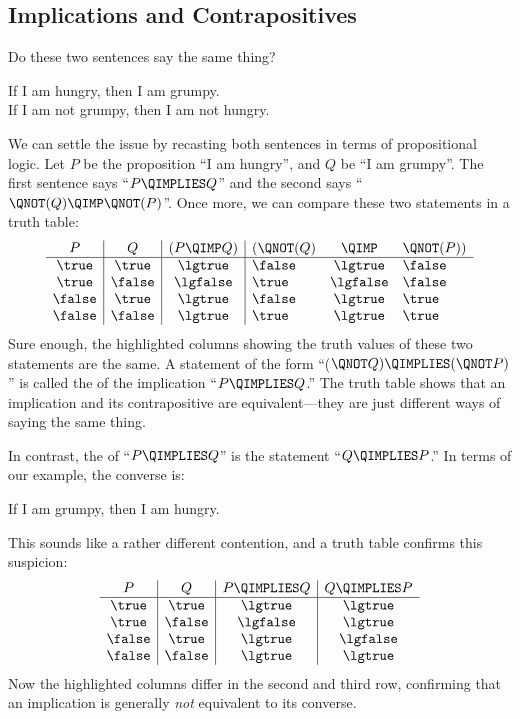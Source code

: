 \subsection{Implications and Contrapositives}\label{implication_sec}
Do these two sentences say the same thing?
%
\begin{center}
If I am hungry, then I am grumpy. \\
If I am not grumpy, then I am not hungry.
\end{center}
%
We can settle the issue by recasting both sentences in terms of
propositional logic.  Let $P$ be the proposition ``I am hungry'', and $Q$
be ``I am grumpy''.  The first sentence says ``$P \QIMPLIES Q$'' and the
second says ``$\QNOT(Q) \QIMP \QNOT(P)$''.  Once more, we can compare
these two statements in a truth table:
%
\[
\begin{array}{c|c|c|lcl}
   P   &   Q    & (P  \QIMP  Q) & (\QNOT(Q) & \QIMP & \QNOT(P)) \\ \hline
\true  & \true  &     \lgtrue   &  \false   & \lgtrue  &  \false\\
\true  & \false &     \lgfalse  &  \true    & \lgfalse &  \false\\
\false & \true  &     \lgtrue   &  \false   & \lgtrue  &  \true \\
\false & \false &     \lgtrue   &  \true    & \lgtrue  &  \true \\
\end{array}
\]
%
Sure enough, the highlighted columns showing the truth values of these two
statements are the same.  A statement of the form ``($\QNOT Q) \QIMPLIES
(\QNOT P)$'' is called the  of the implication ``$P
\QIMPLIES Q$.''  The truth table shows that an implication and its
contrapositive are equivalent---they are just different ways of saying
the same thing.

In contrast, the  of ``$P \QIMPLIES Q$'' is the statement
``$Q \QIMPLIES P$.''  In terms of our example, the converse is:
%
\begin{center}
If I am grumpy, then I am hungry.
\end{center}
%
This sounds like a rather different contention, and a truth table
confirms this suspicion:
%
\[
\begin{array}{c|c|c|c}
P & Q &
    P \QIMPLIES Q &
    Q \QIMPLIES P \\ \hline
\true & \true & \lgtrue & \lgtrue \\
\true & \false & \lgfalse & \lgtrue \\
\false & \true & \lgtrue & \lgfalse \\
\false & \false & \lgtrue & \lgtrue
\end{array}
\]
%
Now the highlighted columns differ in the second and third row, confirming
that an implication is generally \textit{not} equivalent to its converse.

